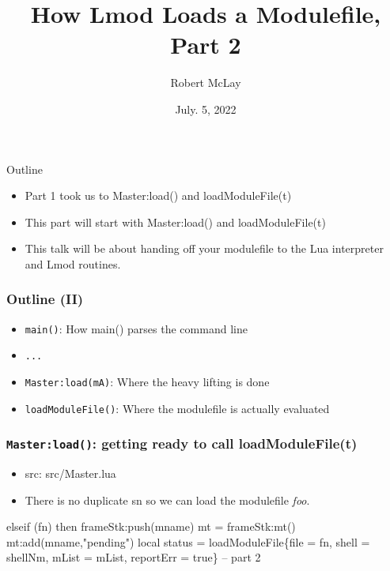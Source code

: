 \documentclass{beamer}
\begin{document}
\title[Lmod]{How Lmod Loads a Modulefile, Part 2}
\author{Robert McLay} 
\date{July. 5, 2022}

\frame{\titlepage} 


\begin{frame}{Outline}
  \begin{itemize}
    \item Part 1 took us to Master:load() and loadModuleFile(t)
    \item This part will start with Master:load() and loadModuleFile(t)
    \item This talk will be about handing off your modulefile to the
      Lua interpreter and Lmod routines.
  \end{itemize}
\end{frame}

\begin{frame}[fragile]
    \frametitle{Outline (II)}
  \begin{itemize}
    \item \texttt{main()}: How main() parses the command line
    \item \texttt{...}
    \item \texttt{Master:load(mA)}: Where the heavy lifting is done
    \item \texttt{loadModuleFile()}: Where the modulefile is actually evaluated
  \end{itemize}
\end{frame}

\begin{frame}[fragile]
    \frametitle{\texttt{Master:load()}: getting ready to call loadModuleFile(t)}
  \begin{itemize}
    \item src: src/Master.lua
    \item There is no duplicate sn so we can load the modulefile {\color{blue}\emph{foo}}.
  \end{itemize}
 {\tiny
    \begin{semiverbatim}
elseif (fn) then
   frameStk:push(mname)
   mt = frameStk:mt()
   mt:add(mname,"pending")
   local status = loadModuleFile\{file = fn, shell = shellNm,
                   mList = mList, reportErr = true\}
   -- part 2

    \end{semiverbatim}
}
\end{frame}
\end{document}
